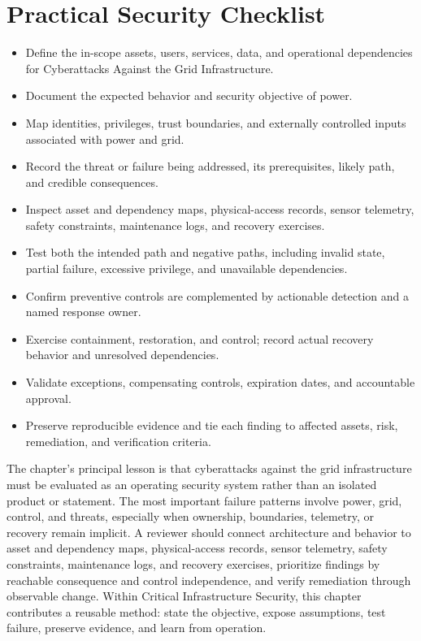 \documentclass[11pt]{article}
\begin{document}
\section*{Practical Security Checklist}
\begin{itemize}[label=$\square$]
\item Define the in-scope assets, users, services, data, and operational dependencies for Cyberattacks Against the Grid Infrastructure.
\item Document the expected behavior and security objective of power.
\item Map identities, privileges, trust boundaries, and externally controlled inputs associated with power and grid.
\item Record the threat or failure being addressed, its prerequisites, likely path, and credible consequences.
\item Inspect asset and dependency maps, physical-access records, sensor telemetry, safety constraints, maintenance logs, and recovery exercises.
\item Test both the intended path and negative paths, including invalid state, partial failure, excessive privilege, and unavailable dependencies.
\item Confirm preventive controls are complemented by actionable detection and a named response owner.
\item Exercise containment, restoration, and control; record actual recovery behavior and unresolved dependencies.
\item Validate exceptions, compensating controls, expiration dates, and accountable approval.
\item Preserve reproducible evidence and tie each finding to affected assets, risk, remediation, and verification criteria.
\end{itemize}
\begin{synthesisbox}
The chapter's principal lesson is that cyberattacks against the grid infrastructure must be evaluated as an operating security system rather than an isolated product or statement. The most important failure patterns involve power, grid, control, and threats, especially when ownership, boundaries, telemetry, or recovery remain implicit. A reviewer should connect architecture and behavior to asset and dependency maps, physical-access records, sensor telemetry, safety constraints, maintenance logs, and recovery exercises, prioritize findings by reachable consequence and control independence, and verify remediation through observable change. Within Critical Infrastructure Security, this chapter contributes a reusable method: state the objective, expose assumptions, test failure, preserve evidence, and learn from operation.
\end{synthesisbox}
\end{document}
